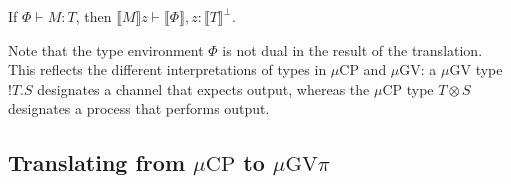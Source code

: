 \documentclass[orivec,envcountsame]{llncs}
\newcommand{\cpdual}[1]{#1^\perp}
\newcommand{\gvout}[2]{{!#1.#2}}
\newcommand{\lto}{\ensuremath{\multimap}}
\newcommand{\cptyp}[2]{#1 \vdash #2}
\newcommand{\gvtyp}[3]{#1 \vdash #2 : #3}
\newcommand{\mapname}{\mathsf{map}}
\newcommand{\map}[3]{\mapname^{#1}_{#2}(#3)}
\newcommand{\mkwd}[1]{\mathsf{#1}}
\newcommand{\link}[2]{#1 \leftrightarrow #2}
\newcommand{\cut}[4]{\mkwd{new}\:#1 \: (#3 \mid #4)}
\newcommand{\rec}[1]{\mkwd{rec}\:#1}
\newcommand{\corec}[5]{\mkwd{corec}\:#1 \langle #2 \rangle (#4,#5)}
\newcommand{\tocpbig}[1]{\left\llbracket #1 \right\rrbracket}
\newcommand{\tocp}[1]{\llbracket #1 \rrbracket}
\newcommand{\mucp}{$\mu\mathrm{CP}$\xspace}
\newcommand{\mugv}{$\mu\mathrm{GV}$\xspace}
\newcommand{\gvpi}{$\mu\mathrm{GV}\pi$\xspace}
\begin{document}

%
%

\begin{theorem}
  If $\gvtyp{\Phi}{M}{T}$, then $\cptyp{\tocp{M}z}{\tocp{\Phi},z:\cpdual{\tocp{T}}}$.
\end{theorem}

Note that the type environment $\Phi$ is not dual in the result of the translation.  This reflects
the different interpretations of types in \mucp and \mugv: a \mugv type $\gvout{T}{S}$ designates a
channel that expects output, whereas the \mucp type $T \otimes S$ designates a process that performs
output.

\subsection{Translating from \mucp to \gvpi}\label{sec:cptogvpi}
\end{document}
